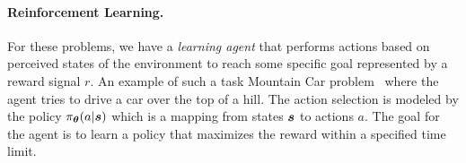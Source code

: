 
\vspace{-3mm}
\paragraph{Reinforcement Learning.} For these problems, we have a \textit{learning agent}
that performs actions based on perceived states of the environment to reach some specific goal represented by a reward signal $r$. An example of such a task Mountain Car problem~\cite{sutton2018reinforcement} where the agent tries to drive a car over the top of a hill. The action selection is modeled by the policy $\pi_{{\bm{\theta}}}(a | {\bm{s}})$ which is a mapping from states ${\bm{s}}$ to actions $a$. The goal for the agent is to learn a policy that maximizes the reward within a specified time limit. 



